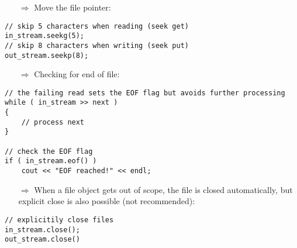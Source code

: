 \documentclass[10pt]{article}
\begin{document}
\begin{enumerate}
\item[$\Rightarrow$] Move the file pointer:
\end{enumerate}
\begin{lstlisting}
// skip 5 characters when reading (seek get)
in_stream.seekg(5);
// skip 8 characters when writing (seek put)
out_stream.seekp(8);
\end{lstlisting}
\begin{enumerate}
\item[$\Rightarrow$] Checking for end of file:
\end{enumerate}
\begin{lstlisting}
// the failing read sets the EOF flag but avoids further processing
while ( in_stream >> next )
{
    // process next
}

// check the EOF flag
if ( in_stream.eof() )
    cout << "EOF reached!" << endl;
\end{lstlisting}
\begin{enumerate}
\item[$\Rightarrow$] When a file object gets out of scope, the file is closed automatically, but explicit
close is also possible (not recommended):
\end{enumerate}
\begin{lstlisting}
// explicitily close files
in_stream.close();
out_stream.close()
\end{lstlisting}
%
%
\end{document}
